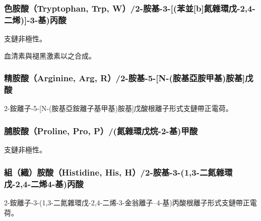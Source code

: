 \documentclass[a4paper,12pt]{report}
\begin{document}
\begin{itemize}
\begin{itemize}
\subsubsection{色胺酸（Tryptophan, Trp, W）/2-胺基-3-[(苯並[b]氮雜環戊-2,4-二烯)]-3-基)丙酸}
支鏈非極性。

血清素與褪黑激素以之合成。
\subsubsection{精胺酸（Arginine, Arg, R）/2-胺基-5-[N-(胺基亞胺甲基)胺基]戊酸}
2-銨離子-5-[N-(胺基亞銨離子基甲基)胺基]戊酸根離子形式支鏈帶正電荷。
\subsubsection{脯胺酸（Proline, Pro, P）/(氮雜環戊烷-2-基)甲酸}
支鏈非極性。
\subsubsection{組（織）胺酸（Histidine, His, H）/2-胺基-3-(1,3-二氮雜環戊-2,4-二烯4-基)丙酸}
2-銨離子-3-(1,3-二氮雜環戊-2,4-二烯-3-金翁離子--4-基)丙酸根離子形式支鏈帶正電荷。

\end{itemize}
\end{itemize}
\end{document}
